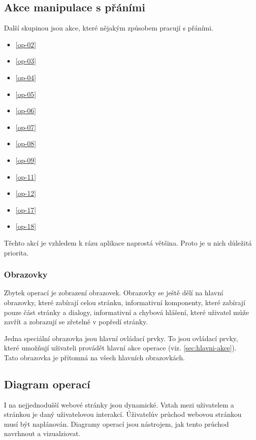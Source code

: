 \subsection{Akce manipulace s přáními}
Další skupinou jsou akce, které nějakým způsobem pracují s přáními.
\begin{multicols}{2}
\begin{itemize}
\item \ref{op-02}
\item \ref{op-03}
\item \ref{op-04}
\item \ref{op-05}
\item \ref{op-06}
\item \ref{op-07}
\item \ref{op-08}
\item \ref{op-09}
\item \ref{op-11}
\item \ref{op-12}
\item \ref{op-17}
\item \ref{op-18}
\end{itemize}
\end{multicols}

Těchto akcí je vzhledem k rázu aplikace naprostá většina. Proto je u nich důležitá priorita.

\subsubsection{Obrazovky}
Zbytek operací je zobrazení obrazovek. Obrazovky se ještě dělí na hlavní obrazovky, které zabírají celou stránku, informativní komponenty, které zabírají pouze část stránky a dialogy, informativní a chybová hlášení, které uživatel může zavřít a zobrazují se zřetelně v popředí stránky.

Jedna speciální obrazovka jsou hlavní ovládací prvky. To jsou ovládací prvky, které umožňují uživateli provádět hlavní akce operace (viz. \ref{sec:hlavni-akce}). Tato obrazovka je přítomná na všech hlavních obrazovkách.

\subsection{Diagram operací}
I na nejjednodušší webové stránky jsou dynamické. Vztah mezi uživatelem a stránkou je daný uživatelovou interakcí. Úživatelův průchod webovou stránkou musí být naplánován. Diagramy operací jsou nástrojem, jak tento průchod navrhnout a vizualziovat\cite{brown2007communicating}.

